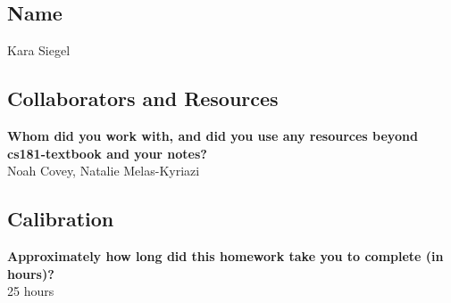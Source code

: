 \documentclass[submit]{harvardml}
\begin{document}
\begin{enumerate}
    


\end{enumerate}
\newpage
\subsection*{Name} Kara Siegel

\subsection*{Collaborators and Resources}
\textbf{Whom did you work with, and did you use any resources beyond cs181-textbook and your notes?}\\
Noah Covey, Natalie Melas-Kyriazi

\subsection*{Calibration}
\textbf{Approximately how long did this homework take you to complete (in hours)?}\\
25 hours
\end{document}
